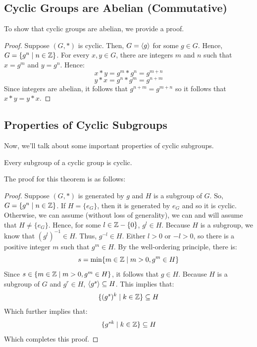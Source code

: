 \documentclass[letterpaper]{article}
\begin{document}
\subsection{Cyclic Groups are Abelian (Commutative)}
To show that cyclic groups are abelian, we provide a proof. 
\begin{mdframed}
    \begin{proof}
        Suppose $(G, *)$ is cyclic. Then, $G = \langle g \rangle$ for some $g \in G$. Hence, $G = \{g^n \mid n \in \mathbb{Z}\}$. For every $x, y \in G$, there are integers $m$ and $n$ such that $x = g^m$ and $y = g^n$. Hence: 
        \[x * y = g^m * g^n = g^{m + n}\]
        \[y * x = g^n * g^m = g^{n + m}\]
        Since integers are abelian, it follows that $g^{n + m} = g^{m + n}$ so it follows that $x * y = y * x$.
    \end{proof}
\end{mdframed}

\subsection{Properties of Cyclic Subgroups}
Now, we'll talk about some important properties of cyclic subgroups.
\begin{theorem}{}{}
    Every subgroup of a cyclic group is cyclic.
\end{theorem}
The proof for this theorem is as follows: 
\begin{mdframed}
    \begin{proof}
        Suppose $(G, *)$ is generated by $g$ and $H$ is a subgroup of $G$. So, $G = \{g^n \mid n \in \mathbb{Z}\}$. If $H = \{e_G\}$, then it is generated by $e_G$ and so it is cyclic. Otherwise, we can assume (without loss of generality), we can and will assume that $H \neq \{e_G\}$. Hence, for some $l \in \mathbb{Z} - \{0\}$, $g^l \in H$. Because $H$ is a subgroup, we know that $(g^l)^{-1} \in H$. Thus, $g^{-l} \in H$. Either $l > 0$ or $-l > 0$, so there is a positive integer $m$ such that $g^m \in H$. By the well-ordering principle, there is: 
        \[s = \min\{m \in \mathbb{Z} \mid m > 0, g^m \in H\}\]
        Since $s \in \{m \in \mathbb{Z} \mid m > 0, g^m \in H\}$, it follows that $g \in H$. Because $H$ is a subgroup of $G$ and $g^r \in H$, $\langle g^s \rangle \subseteq H$. This implies that: 
        \[\{(g^s)^k \mid k \in \mathbb{Z}\} \subseteq H\]
        Which further implies that: 
        \[\{g^{sk} \mid k \in \mathbb{Z}\} \subseteq H\]
        Which completes this proof.
    \end{proof}
\end{mdframed} %
\end{document}
